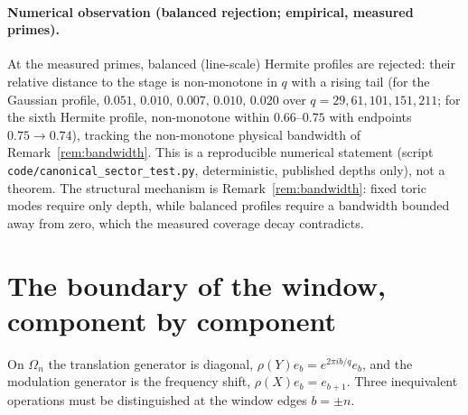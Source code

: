 \documentclass[11pt,a4paper]{article}
\theoremstyle{plain}
\theoremstyle{definition}
\theoremstyle{remark}
\begin{document}
    \paragraph{Numerical observation (balanced rejection; empirical, measured primes).}
    At the measured primes, balanced (line-scale) Hermite profiles are rejected: their relative
    distance to the stage is non-monotone in $q$ with a rising tail
    (for the Gaussian profile, $0.051,\, 0.010,\, 0.007,\, 0.010,\, 0.020$ over
    $q = 29, 61, 101, 151, 211$; for the sixth Hermite profile, non-monotone within
    $0.66$--$0.75$ with endpoints $0.75 \to 0.74$), tracking the non-monotone physical bandwidth of
    Remark~\ref{rem:bandwidth}.
    This is a reproducible numerical statement (script \texttt{code/canonical\_sector\_test.py},
    deterministic, published depths only), not a theorem.
    The structural mechanism is Remark~\ref{rem:bandwidth}: fixed toric modes require only depth, while
    balanced profiles require a bandwidth bounded away from zero, which the measured coverage decay
    contradicts.

  \section{The boundary of the window, component by component}
  \label{sec:boundary}

    On $\Omega_n$ the translation generator is diagonal, $\rho(Y) e_b = e^{2\pi i b/q} e_b$, and the
    modulation generator is the frequency shift, $\rho(X) e_b = e_{b+1}$.
    Three inequivalent operations must be distinguished at the window edges $b = \pm n$.
\end{document}

